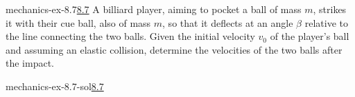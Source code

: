 \documentclass[preview]{standalone}
\begin{document}
\begin{snippetexercise}{mechanics-ex-8.7}{\underline{8.7}}
    A billiard player, aiming to pocket a ball of mass \(m\), strikes it with their cue ball,
    also of mass \(m\), so that it deflects at an angle \(\beta\) relative to the line connecting the
    two balls. Given the initial velocity \(v_0\) of the player's ball and assuming an elastic collision,
    determine the velocities of the two balls after the impact.
\end{snippetexercise}

\begin{snippetsolution}{mechanics-ex-8.7-sol}{\underline{8.7}}
    \todo
\end{snippetsolution}
\end{document}

